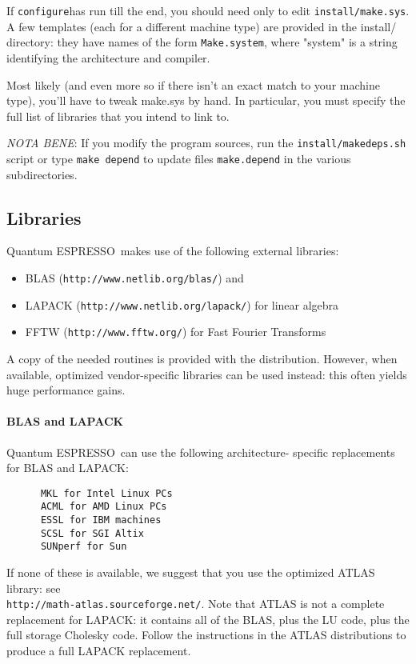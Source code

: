\documentclass[12pt,a4paper]{article}
\def\qe{{\sc Quantum ESPRESSO}}
\def\configure{\texttt{configure}}
\begin{document}
If \configure has run till the end, you should need only to
edit \texttt{install/make.sys}. A few templates (each for a different 
machine type)
are provided in the install/ directory: they have names of the
form \texttt{Make.system}, where "system" is a string identifying the 
architecture and compiler.
  
Most likely (and even more so if there isn't an exact match to your 
machine type), you'll have to tweak make.sys by hand. In particular, 
you must
specify the full list of libraries that you intend to link to.
    
{\em NOTA BENE}:
If you modify the program sources, run the
\texttt{install/makedeps.sh}  script  or type \texttt{make depend} 
to update files \texttt{make.depend} in the various 
subdirectories.

\subsection{Libraries}
\label{Sec:Libraries}

\qe\ makes use of the following external libraries:
\begin{itemize}
\item BLAS (\texttt{http://www.netlib.org/blas/}) and 
\item LAPACK (\texttt{http://www.netlib.org/lapack/}) for linear algebra 
\item FFTW (\texttt{http://www.fftw.org/}) for Fast Fourier Transforms
\end{itemize}
A copy of the needed routines is provided with the distribution. However,
when available, optimized vendor-specific libraries can be used instead: this
often yields huge performance gains.

\paragraph{BLAS and LAPACK} 
\qe\ can use the following architecture-
specific replacements for BLAS and LAPACK:
\begin{verbatim}
      MKL for Intel Linux PCs
      ACML for AMD Linux PCs
      ESSL for IBM machines
      SCSL for SGI Altix
      SUNperf for Sun
\end{verbatim}
If none of these is available, we suggest that you use the optimized ATLAS library: see \\
\texttt{http://math-atlas.sourceforge.net/}. Note that ATLAS is not
a complete replacement for LAPACK: it contains all of the BLAS, plus the
LU code, plus the full storage Cholesky code. Follow the instructions in the
ATLAS distributions to produce a full LAPACK replacement.
    
\end{document}
